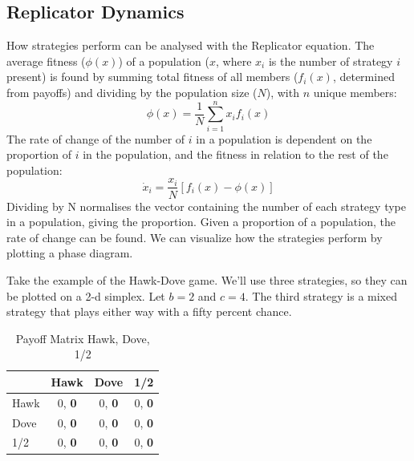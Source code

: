 \documentclass[a4paper,11pt,bcshonoursthesis,singlespace,twoside,thesisdraft,pdflatex]{cssethesis}
\begin{document}
\subsection{Replicator Dynamics}
How strategies perform can be analysed with the Replicator equation. 
The average fitness ($\phi(x)$) of a population ($x$, where $x_i$ is the number of strategy $i$ present) is found by summing total fitness of all members ($f_i(x)$, determined from payoffs) and dividing by the population size ($N$), with $n$ unique members:
\begin{equation}
\phi(x)=\frac{1}{N}\sum_{i=1}^n x_i f_i(x)
\end{equation}
The rate of change of the number of $i$ in a population is dependent on the proportion of $i$ in the population, and the fitness in relation to the rest of the population:
\begin{equation}
\dot{x}_i=\frac{x_i}{N} [ f_i(x)-\phi(x)]
\end{equation}
Dividing by N normalises the vector containing the number of each strategy type in a population, giving the proportion. 
Given a proportion of a population, the rate of change can be found. 
We can visualize how the strategies perform by plotting a phase diagram.  

Take the example of the Hawk-Dove game. We'll use three strategies, so they can be plotted on a 2-d simplex. Let $b=2$ and $c=4$. The third strategy is a mixed strategy that plays either way with a fifty percent chance. 

\begin{table}[h]\centering
\captionsetup{justification=centering}
\begin{tabular}{|l|c|c|c|}
\hline
 & \bf{Hawk} & \bf{Dove} &\bf{1/2}\\
\hline
Hawk & 0, \bf{0} & 0, \bf{0}& 0, \bf{0}\\
\hline
Dove & 0, \bf{0}  & 0, \bf{0}& 0, \bf{0} \\
\hline
1/2 & 0, \bf{0}  & 0, \bf{0}& 0, \bf{0} \\
\hline
\end{tabular}
\caption{Payoff Matrix Hawk, Dove, 1/2}
\label{table:hawkdove50}
\end{table}
\end{document}
